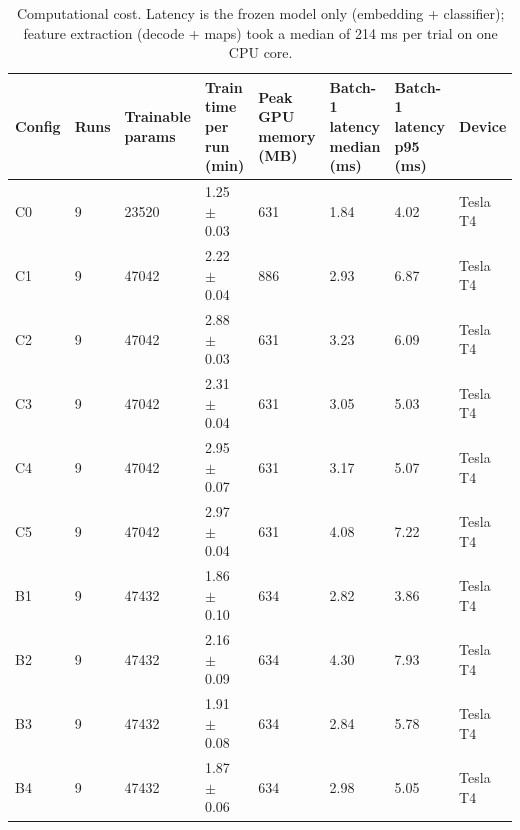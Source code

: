 \begin{table}[t]
\centering
\small
\caption{Computational cost. Latency is the frozen model only (embedding + classifier); feature extraction (decode + maps) took a median of 214 ms per trial on one CPU core.}
\label{tab:T5_cost}
\begin{tabular}{llllllll}
\hline
Config & Runs & Trainable params & Train time per run (min) & Peak GPU memory (MB) & Batch-1 latency median (ms) & Batch-1 latency p95 (ms) & Device \\
\hline
C0 & 9 & 23520 & 1.25 $\pm$ 0.03 & 631 & 1.84 & 4.02 & Tesla T4 \\
C1 & 9 & 47042 & 2.22 $\pm$ 0.04 & 886 & 2.93 & 6.87 & Tesla T4 \\
C2 & 9 & 47042 & 2.88 $\pm$ 0.03 & 631 & 3.23 & 6.09 & Tesla T4 \\
C3 & 9 & 47042 & 2.31 $\pm$ 0.04 & 631 & 3.05 & 5.03 & Tesla T4 \\
C4 & 9 & 47042 & 2.95 $\pm$ 0.07 & 631 & 3.17 & 5.07 & Tesla T4 \\
C5 & 9 & 47042 & 2.97 $\pm$ 0.04 & 631 & 4.08 & 7.22 & Tesla T4 \\
B1 & 9 & 47432 & 1.86 $\pm$ 0.10 & 634 & 2.82 & 3.86 & Tesla T4 \\
B2 & 9 & 47432 & 2.16 $\pm$ 0.09 & 634 & 4.30 & 7.93 & Tesla T4 \\
B3 & 9 & 47432 & 1.91 $\pm$ 0.08 & 634 & 2.84 & 5.78 & Tesla T4 \\
B4 & 9 & 47432 & 1.87 $\pm$ 0.06 & 634 & 2.98 & 5.05 & Tesla T4 \\
\hline
\end{tabular}
\end{table}
